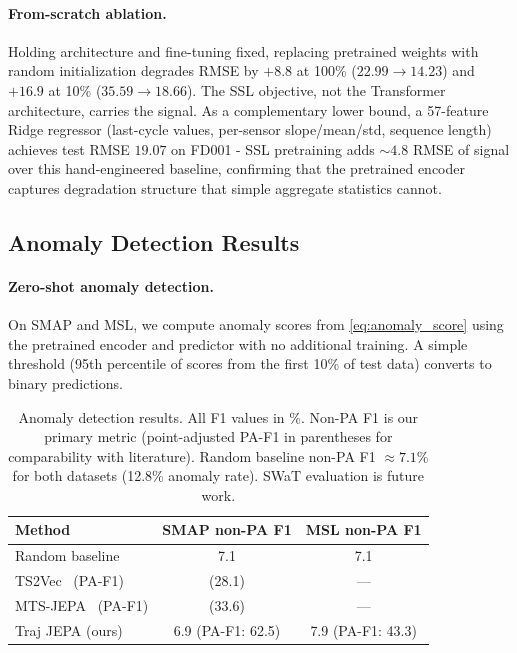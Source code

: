 \documentclass{article}
\begin{document}
\paragraph{From-scratch ablation.}
\label{sec:from_scratch}
Holding architecture and fine-tuning fixed, replacing pretrained weights with random initialization degrades RMSE by $+8.8$ at 100\% ($22.99 \to 14.23$) and $+16.9$ at 10\% ($35.59 \to 18.66$). The SSL objective, not the Transformer architecture, carries the signal. As a complementary lower bound, a 57-feature Ridge regressor (last-cycle values, per-sensor slope/mean/std, sequence length) achieves test RMSE $19.07$ on FD001 - SSL pretraining adds $\sim 4.8$ RMSE of signal over this hand-engineered baseline, confirming that the pretrained encoder captures degradation structure that simple aggregate statistics cannot.

\subsection{Anomaly Detection Results}
\label{sec:anomaly_results}

\paragraph{Zero-shot anomaly detection.} On SMAP and MSL, we compute anomaly scores from \cref{eq:anomaly_score} using the pretrained encoder and predictor with no additional training. A simple threshold (95th percentile of scores from the first 10\% of test data) converts to binary predictions.

\begin{table}[h]
\centering
\caption{Anomaly detection results. All F1 values in \%. Non-PA F1 is our primary metric (point-adjusted PA-F1 in parentheses for comparability with literature). Random baseline non-PA F1 $\approx 7.1\%$ for both datasets (12.8\% anomaly rate). SWaT evaluation is future work.}
\label{tab:anomaly}
\small
\begin{tabular}{@{}lcc@{}}
\toprule
Method & SMAP non-PA F1 & MSL non-PA F1 \\
\midrule
Random baseline & 7.1 & 7.1 \\
TS2Vec~\citep{yue2022ts2vec} (PA-F1) & (28.1) & --- \\
MTS-JEPA~\citep{mtsjepa2026} (PA-F1) & (33.6) & --- \\
\midrule
Traj JEPA (ours) & 6.9 (PA-F1: 62.5) & 7.9 (PA-F1: 43.3) \\
\bottomrule
\end{tabular}
\end{table}
\end{document}

